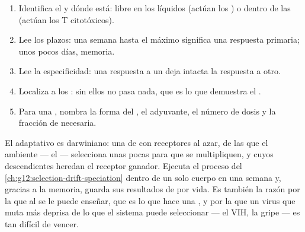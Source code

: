 \begin{method}\label{met:g12:adaptive-immunity:read}
\begin{enumerate}
  \item Identifica el  y dónde está: libre en los líquidos
        (actúan los ) o dentro de las  (actúan los T
        citotóxicos).
  \item Lee los plazos: una semana hasta el máximo significa una
        respuesta primaria; unos pocos días, memoria.
  \item Lee la especificidad: una respuesta a un  deja intacta
        la respuesta a otro.
  \item Localiza a los : sin ellos no pasa
        nada, que es lo que demuestra el .
  \item Para una , nombra la forma del , el adyuvante, el
        número de dosis y la fracción de  necesaria.
\end{enumerate}
\end{method}

\begin{remark}\label{rem:g12:adaptive-immunity:selection}
El  adaptativo es darwiniano: una  de
 con receptores al azar, de las que el ambiente --- el 
--- selecciona unas pocas para que se multipliquen, y cuyos
descendientes heredan el receptor ganador. Ejecuta el proceso del
\cref{ch:g12:selection-drift-speciation} dentro de un solo cuerpo en
una semana y, gracias a la memoria, guarda sus resultados de por vida.
Es también la razón por la que al  se le puede
enseñar, que es lo que hace una , y por la que un virus que muta
más deprisa de lo que el sistema puede seleccionar --- el VIH, la
gripe --- es tan difícil de vencer.
\end{remark}

